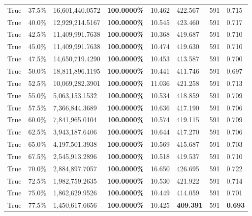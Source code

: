 \begin{table}[H]
\begin{tabular}{lllrllll}
\cline{1-8}
True & 37.5\% & 16,601,440.0572 & \bfseries \color{red} 100.0000\% & 10.462 & 422.567 & 591 & 0.715 \\
\cline{1-8}
True & 40.0\% & 12,929,214.5167 & \bfseries \color{red} 100.0000\% & 10.545 & 423.460 & 591 & 0.717 \\
\cline{1-8}
True & 42.5\% & 11,409,991.7638 & \bfseries \color{red} 100.0000\% & 10.368 & 419.687 & 591 & 0.710 \\
\cline{1-8}
True & 45.0\% & 11,409,991.7638 & \bfseries \color{red} 100.0000\% & 10.474 & 419.630 & 591 & 0.710 \\
\cline{1-8}
True & 47.5\% & 14,650,719.4290 & \bfseries \color{red} 100.0000\% & 10.453 & 413.587 & 591 & 0.700 \\
\cline{1-8}
True & 50.0\% & 18,811,896.1195 & \bfseries \color{red} 100.0000\% & 10.441 & 411.746 & 591 & 0.697 \\
\cline{1-8}
True & 52.5\% & 10,069,282.3901 & \bfseries \color{red} 100.0000\% & 11.036 & 421.258 & 591 & 0.713 \\
\cline{1-8}
True & 55.0\% & 5,063,153.1532 & \bfseries \color{red} 100.0000\% & 10.534 & 418.859 & 591 & 0.709 \\
\cline{1-8}
True & 57.5\% & 7,366,844.3689 & \bfseries \color{red} 100.0000\% & 10.636 & 417.190 & 591 & 0.706 \\
\cline{1-8}
True & 60.0\% & 7,841,965.0104 & \bfseries \color{red} 100.0000\% & 10.574 & 419.115 & 591 & 0.709 \\
\cline{1-8}
True & 62.5\% & 3,943,187.6406 & \bfseries \color{red} 100.0000\% & 10.644 & 417.270 & 591 & 0.706 \\
\cline{1-8}
True & 65.0\% & 4,197,501.3938 & \bfseries \color{red} 100.0000\% & 10.569 & 415.687 & 591 & 0.703 \\
\cline{1-8}
True & 67.5\% & 2,545,913.2896 & \bfseries \color{red} 100.0000\% & 10.518 & 419.537 & 591 & 0.710 \\
\cline{1-8}
True & 70.0\% & 2,884,897.7057 & \bfseries \color{red} 100.0000\% & 16.650 & 426.695 & 591 & 0.722 \\
\cline{1-8}
True & 72.5\% & 1,982,759.2635 & \bfseries \color{red} 100.0000\% & 10.530 & 421.922 & 591 & 0.714 \\
\cline{1-8}
True & 75.0\% & 1,862,629.9526 & \bfseries \color{red} 100.0000\% & 10.449 & 414.059 & 591 & 0.701 \\
\cline{1-8}
True & 77.5\% & 1,450,617.6656 & \bfseries \color{red} 100.0000\% & 10.425 & \bfseries \color{red} 409.391 & 591 & \bfseries \color{red} 0.693 \\

\end{tabular}
\end{table}
